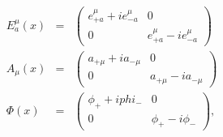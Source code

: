 \begin{equation}
\begin{array}{ccc}
E^\mu_a(x) & = & \left(
             \begin{array}{cc}
              e^\mu_{+a} + i e^\mu_{-a} & 0 \\
                0   & e^\mu_{+a} - i e^\mu_{-a}
             \end{array}
             \right) \\


A_\mu(x)  & = & \left(
              \begin{array}{cc}
              a_{+\mu} + i a_{-\mu} & 0 \\
              0 &    a_{+\mu} - i a_{-\mu}
              \end{array}
              \right) \\

\Phi(x) & = & \left(
              \begin{array}{cc}
              \phi_+ + i phi_- & 0 \\
               0 & \phi_+ - i \phi_-
               \end{array}
               \right),
\end{array}
\end{equation}

